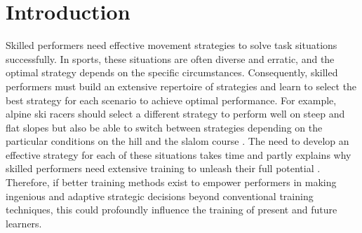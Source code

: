 \documentclass[pdflatex,sn-nature]{sn-jnl}%
\theoremstyle{thmstyleone}%
\theoremstyle{thmstyletwo}%
\theoremstyle{thmstylethree}%
\begin{document}
\section{Introduction}
Skilled performers need effective movement strategies to solve task situations successfully\cite{krakauer_motor_2019,wolpert_motor_2010, wolpert_principles_2011, gray_plateaus_2017, diedrichsen_motor_2015, chen_effects_2018, stanley_motor_2013, du_relationship_2022, mangalam_investigating_2023, taylor_role_2012, tsay_strategy_2023}. In sports, these situations are often diverse and erratic, and the optimal strategy depends on the specific circumstances. Consequently, skilled performers must build an extensive repertoire of strategies and learn to select the best strategy for each scenario to achieve optimal performance\cite{krakauer_motor_2019, du_relationship_2022,mangalam_investigating_2023,wolpert_principles_2011, gallivan_decision-making_2018}. For example, alpine ski racers should select a different strategy to perform well on steep and flat slopes \cite{supej_impact_2015} but also be able to switch between strategies depending on the particular conditions on the hill and the slalom course \cite{reid_kinematic_2010}. The need to develop an effective strategy for each of these situations takes time and partly explains why skilled performers need extensive training to unleash their full potential \cite{krakauer_motor_2019}. Therefore, if better training methods exist to empower performers in making ingenious and adaptive strategic decisions beyond conventional training techniques, this could profoundly influence the training of present and future learners.

\end{document}
